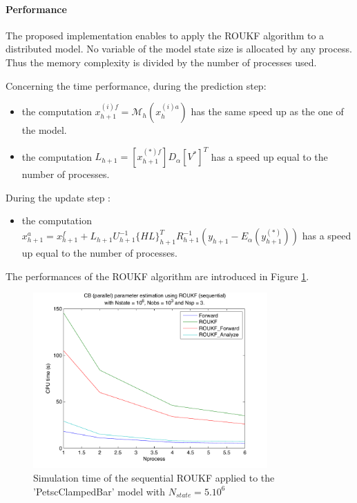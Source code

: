 \hypertarget{seq-par-roukf-p}{}\paragraph{Performance}\label{seq-par-roukf-p}

The proposed implementation enables to apply the ROUKF algorithm to a distributed model.  No variable of the model state size is allocated by any process. Thus the memory complexity is divided by the number of processes used.

Concerning the time performance, during the prediction step:

\begin{itemize}
 \item the computation  $ x_{h+1}^{(i)f} = \mathcal{M}_{h}(x_{h}^{(i)a})$ has the same speed up as the one of the model.
 \item the computation  $ L_{h+1} = [x_{h+1}^{(*)f}]D_\alpha [V^*]^T $ has a speed up equal to the number of processes.
 \end{itemize}
During the update step :
\begin{itemize}
\item the computation  $ x_{h+1}^a = x_{h+1}^f + L_{h+1}U_{h+1}^{-1}\{HL\}_{h+1}^T R_{h+1}^{-1} (y_{h+1}-E_\alpha(y_{h+1}^{(*)})) $ has a speed up equal to the number of processes.\\
\end{itemize}

The performances of the ROUKF algorithm are introduced in Figure  \ref{fig:roukf_time}.


\begin{figure}
  \caption{Simulation time of the sequential  ROUKF applied to the 'PetscClampedBar' model with $N_{state} = 5.10^6$}
  \label{fig:roukf_time}

\includegraphics[width=0.8\textwidth]{figure/ROUKF_Seq_CB_Par_2.pdf}
\end{figure}



